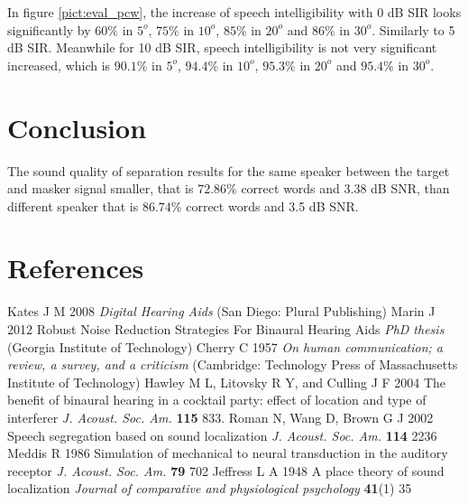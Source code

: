 \documentclass[a4paper]{jpconf}
\begin{document}
In figure \ref{pict:eval_pcw}, the increase of speech intelligibility with 0 dB SIR looks significantly by $60\%$ in $5^o$, $75\%$ in $10^o$, $85\%$ in $20^o$ and $86\%$ in $30^o$. Similarly to 5 dB SIR. Meanwhile for 10 dB SIR, speech intelligibility is not very significant increased, which is $90.1\%$ in $5^o$, $94.4\%$ in $10^o$, $95.3\%$ in $20^o$ and $95.4\%$ in $30^o$.

\section{Conclusion}
The sound quality of separation results for the same speaker between the target and masker signal smaller, that is $72.86\%$ correct words and 3.38 dB SNR, than different speaker that is $86.74\%$ correct words and 3.5 dB SNR.

\section*{References}
\begin{thebibliography}{9}
		Kates J M 2008 {\it Digital Hearing Aids} (San Diego: Plural Publishing)
	Marin J 2012 Robust Noise Reduction Strategies For Binaural Hearing Aids {\it PhD thesis} (Georgia Institute of Technology)
		Cherry C 1957 {\it On human communication; a review, a survey, and a criticism} (Cambridge: Technology Press of Massachusetts Institute of Technology)
		Hawley M L, Litovsky R Y, and Culling J F 2004 The benefit of binaural hearing in a cocktail party: effect of location and type of interferer {\it J. Acoust. Soc. Am.} {\bf 115} 833.
		Roman N, Wang D, Brown G J 2002 Speech segregation based on sound localization {\it J. Acoust. Soc. Am.} {\bf 114} 2236
		Meddis R 1986 Simulation of mechanical to neural transduction in the auditory receptor {\it J. Acoust. Soc. Am.} {\bf 79} 702
		Jeffress L A 1948 A place theory of sound localization {\it Journal of comparative and physiological psychology} {\bf 41}(1) 35
\end{thebibliography}
\end{document}
